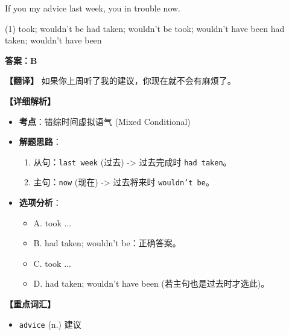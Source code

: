 \documentclass[11pt, a4paper]{article}
\newcommand{\analysis}[4]{
    \begin{solutionbox}
        \textbf{答案：#1}
        
        \textbf{【翻译】} #2
        
        \textbf{【详细解析】}
        #3
        
        \textbf{【重点词汇】}
        #4
    \end{solutionbox}
}
\newcommand{\blank}{\underline{\hspace{1.5cm}}}
\begin{document}
\begin{questions}
    \item If you \blank my advice last week, you \blank in trouble now.
    \begin{tasks}(1)
        \task took; wouldn’t be
        \task had taken; wouldn’t be
        \task took; wouldn’t have been
        \task had taken; wouldn’t have been
    \end{tasks}
    \analysis{B}{如果你上周听了我的建议，你现在就不会有麻烦了。}{
        \begin{itemize}
            \item \textbf{考点}：错综时间虚拟语气 (Mixed Conditional)
            \item \textbf{解题思路}：
                \begin{enumerate}
                    \item 从句：\texttt{last week} (过去) -> 过去完成时 \texttt{had taken}。
                    \item 主句：\texttt{now} (现在) -> 过去将来时 \texttt{wouldn't be}。
                \end{enumerate}
            \item \textbf{选项分析}：
                \begin{itemize}
                    \item A. took ...
                    \item B. had taken; wouldn’t be：正确答案。
                    \item C. took ...
                    \item D. had taken; wouldn’t have been (若主句也是过去时才选此)。
                \end{itemize}
        \end{itemize}
    }{
        \begin{itemize}
            \item \texttt{advice} (n.) 建议
        \end{itemize}
    }


\end{questions}
\end{document}
